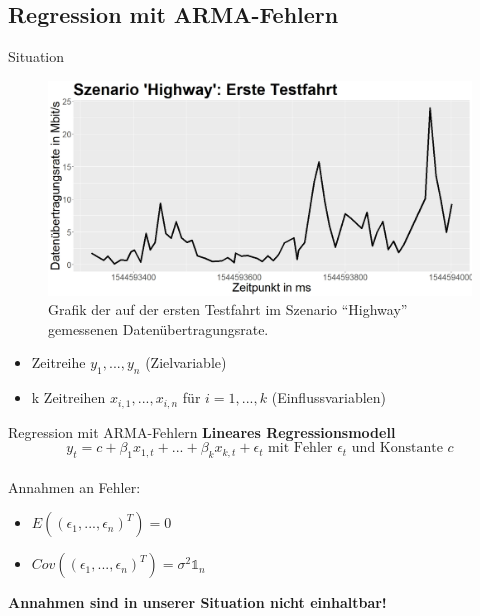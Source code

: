 \subsection{Regression mit ARMA-Fehlern}

\begin{frame}{Situation}
	\begin{figure}[]
		\includegraphics[scale=0.25]{highway_drive_one}
		\caption{Grafik der auf der ersten Testfahrt im Szenario ``Highway'' gemessenen Datenübertragungsrate.}
		\label{highway_drive_one}
	\end{figure}
	
	\begin{itemize}
		\item Zeitreihe $y_1,...,y_n$ (Zielvariable)
		\item k Zeitreihen $x_{i,1},...,x_{i,n}$ für $i=1,...,k$ (Einflussvariablen)
	\end{itemize}
\end{frame}

\begin{frame}{Regression mit ARMA-Fehlern}
	\textbf{Lineares Regressionsmodell} \\
	$$y_{t} = c + \beta_1 x_{1,t} + ... + \beta_k x_{k,t} + \epsilon_t \text{ mit Fehler } \epsilon_t \text{ und Konstante }c$$ \\
	Annahmen an Fehler:
	\begin{itemize}
		\item $E((\epsilon_1,...,\epsilon_n)^T) = 0$
		\item $Cov((\epsilon_1,...,\epsilon_n)^T)=\sigma^2 \mathds{1}_n$
	\end{itemize}
	\textbf{Annahmen sind in unserer Situation nicht einhaltbar!}
\end{frame}


